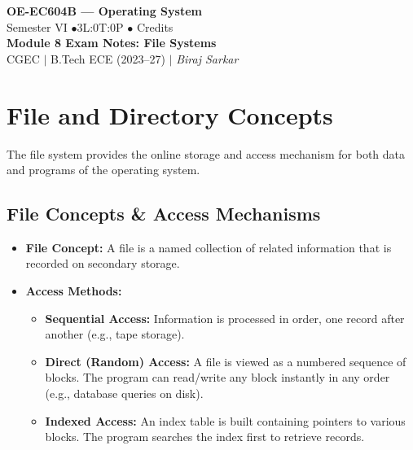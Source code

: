 \documentclass[12pt,a4paper]{article}
\begin{document}

\begin{center}
  {\LARGE\bfseries\color{myred} OE-EC604B --- Operating System}\\[5pt]
  {\normalsize\color{mydark} Semester VI \quad$\bullet$\quad 3L:0T:0P \quad$\bullet$ Credits}\\[3pt]
  {\normalsize\color{myteal}\textbf{Module 8 Exam Notes: File Systems}}\\[3pt]
  {\small\color{mydark} CGEC \;$|$\; B.Tech ECE (2023--27) \;$|$\; \textit{Biraj Sarkar}}
\end{center}
\vspace{2pt}
\noindent{\color{myred}\rule{\linewidth}{1.5pt}}
\vspace{2pt}

\hypersetup{linkcolor=mydark}
\tableofcontents
\hypersetup{linkcolor=myteal}
\newpage

\section{File and Directory Concepts}

The file system provides the online storage and access mechanism for both data and programs of the operating system.

\subsection{File Concepts \& Access Mechanisms}
\begin{itemize}[leftmargin=*, itemsep=3pt]
  \item \textbf{File Concept:} A file is a named collection of related information that is recorded on secondary storage.
  \item \textbf{Access Methods:}
  \begin{itemize}[leftmargin=*, itemsep=2.5pt, topsep=0pt]
    \item \textbf{Sequential Access:} Information is processed in order, one record after another (e.g., tape storage).
    \item \textbf{Direct (Random) Access:} A file is viewed as a numbered sequence of blocks. The program can read/write any block instantly in any order (e.g., database queries on disk).
    \item \textbf{Indexed Access:} An index table is built containing pointers to various blocks. The program searches the index first to retrieve records.
    \end{itemize}
  \end{itemize}
\end{document}
